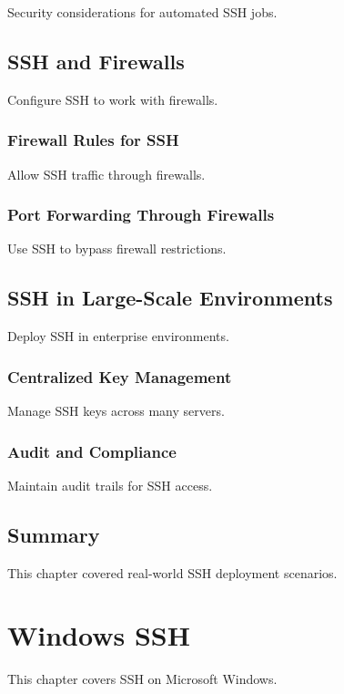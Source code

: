 \documentclass[12pt]{book}
\begin{document}
Security considerations for automated SSH jobs.

\section{SSH and Firewalls}

Configure SSH to work with firewalls.

\subsection{Firewall Rules for SSH}

Allow SSH traffic through firewalls.

\subsection{Port Forwarding Through Firewalls}

Use SSH to bypass firewall restrictions.

\section{SSH in Large-Scale Environments}

Deploy SSH in enterprise environments.

\subsection{Centralized Key Management}

Manage SSH keys across many servers.

\subsection{Audit and Compliance}

Maintain audit trails for SSH access.

\section{Summary}

This chapter covered real-world SSH deployment scenarios.

\chapter{Windows SSH}

This chapter covers SSH on Microsoft Windows.
\end{document}
